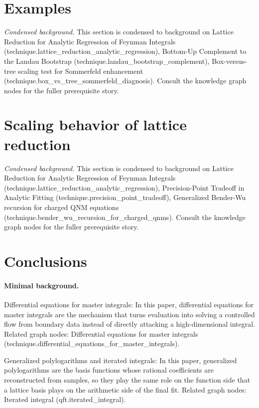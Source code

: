 \documentclass[a4paper,11pt]{article}
\begin{document}
\section{Examples}

\noindent\textit{Condensed background.} This section is condensed to background on Lattice Reduction for Analytic Regression of Feynman Integrals (technique.lattice\_reduction\_analytic\_regression), Bottom-Up Complement to the Landau Bootstrap (technique.landau\_bootstrap\_complement), Box-versus-tree scaling test for Sommerfeld enhancement (technique.box\_vs\_tree\_sommerfeld\_diagnosis). Consult the knowledge graph nodes for the fuller prerequisite story.

\section{Scaling behavior of lattice reduction}

\noindent\textit{Condensed background.} This section is condensed to background on Lattice Reduction for Analytic Regression of Feynman Integrals (technique.lattice\_reduction\_analytic\_regression), Precision-Point Tradeoff in Analytic Fitting (technique.precision\_point\_tradeoff), Generalized Bender-Wu recursion for charged QNM equations (technique.bender\_wu\_recursion\_for\_charged\_qnms). Consult the knowledge graph nodes for the fuller prerequisite story.

\section{Conclusions}

\paragraph{Minimal background.}
\noindent Differential equations for master integrals: In this paper, differential equations for master integrals are the mechanism that turns evaluation into solving a controlled flow from boundary data instead of directly attacking a high-dimensional integral. Related graph nodes: Differential equations for master integrals (technique.differential\_equations\_for\_master\_integrals).

\noindent Generalized polylogarithms and iterated integrals: In this paper, generalized polylogarithms are the basis functions whose rational coefficients are reconstructed from samples, so they play the same role on the function side that a lattice basis plays on the arithmetic side of the final fit. Related graph nodes: Iterated integral (qft.iterated\_integral).
\end{document}
